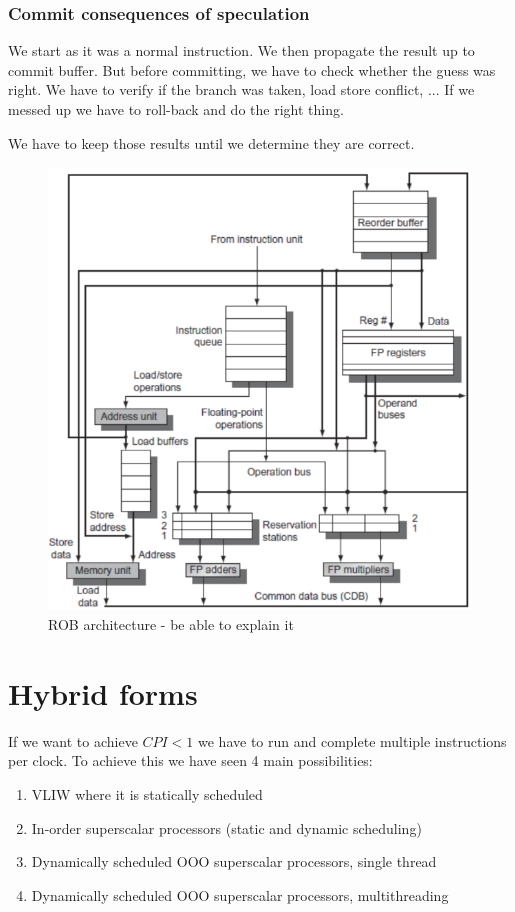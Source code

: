\documentclass{report}
\begin{document}
\subsubsection{Commit consequences of speculation}

We start as it was a normal instruction. We then propagate the result up to commit buffer. But before committing, we have to check whether the guess was right. We have to verify if the branch was taken, load store conflict, ... If we messed up we have to roll-back and do the right thing.

We have to keep those results until we determine they are correct.

\begin{figure}[H]
    \centering
    \includegraphics[width=0.5\linewidth]{ROB_architecture.png}
    \caption{ROB architecture - be able to explain it}
    \label{fig:ROB-architecture-label}
\end{figure}

\section{Hybrid forms}

If we want to achieve $CPI<1$ we have to run and complete multiple instructions per clock. To achieve this we have seen 4 main possibilities:

\begin{enumerate}
    \item VLIW where it is statically scheduled
    \item In-order superscalar processors (static and dynamic scheduling)
    \item Dynamically scheduled OOO superscalar processors, single thread
    \item Dynamically scheduled OOO superscalar processors, multithreading 
\end{enumerate}
\end{document}
